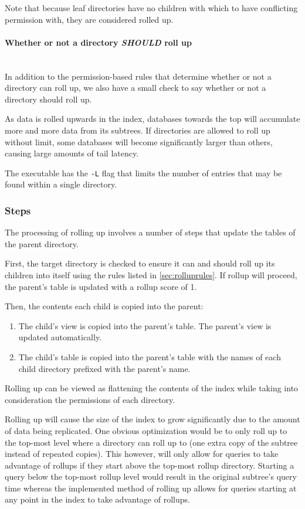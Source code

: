 Note that because leaf directories have no children with which to have
conflicting permission with, they are considered rolled up.

\paragraph{Whether or not a directory {\it SHOULD} roll up} ~\\
In addition to the permission-based rules that determine whether or
not a directory can roll up, we also have a small check to say whether
or not a directory should roll up.

As data is rolled upwards in the index, databases towards the top will
accumulate more and more data from its subtrees. If directories are
allowed to roll up without limit, some databases will become
significantly larger than others, causing large amounts of tail
latency.

The \rollup executable has the \texttt{-L} flag that limits the number
of entries that may be found within a single directory.

\subsubsection{Steps}
The processing of rolling up involves a number of steps that update
the tables of the parent directory.

First, the target directory is checked to ensure it can and should
roll up its children into itself using the rules listed in
\ref{sec:rolluprules}. If rollup will proceed, the parent's \summary table
is updated with a rollup score of 1.

Then, the contents each child is copied into the parent:

\begin{enumerate}
\item The child's \pentries view is copied into the parent's
  \pentriesrollup table. The parent's \pentries view is updated
  automatically.
\item The child's \summary table is copied into the parent's \summary
  table with the names of each child directory prefixed with the parent's
  name.
\end{enumerate}

Rolling up can be viewed as flattening the contents of the index while
taking into consideration the permissions of each directory.

Rolling up will cause the size of the index to grow significantly due
to the amount of data being replicated. One obvious optimization would
be to only roll up to the top-most level where a directory can roll up
to (one extra copy of the subtree instead of repeated copies). This
however, will only allow for queries to take advantage of rollups if
they start above the top-most rollup directory. Starting a query below
the top-most rollup level would result in the original subtree's query
time whereas the implemented method of rolling up allows for queries
starting at any point in the index to take advantage of rollups.

